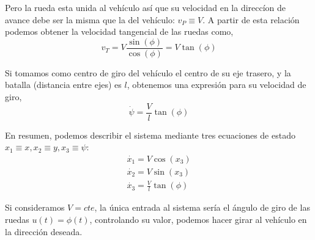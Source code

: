 Pero la rueda esta unida al vehículo así que su velocidad en la direccíon de avance debe ser la misma que la del vehículo: $v_P \equiv V$.  A partir de esta relación podemos obtener la velocidad tangencial de las ruedas como,
\begin{equation}
v_T = V\frac{\sin(\phi)}{\cos(\phi)} = V\tan(\phi)
\end{equation}

Si tomamos como centro de giro del vehículo el centro de su eje trasero, y la batalla (distancia entre ejes) es $l$, obtenemos una expresión para su velocidad de giro,
\begin{equation}
\dot{\psi} = \frac{V}{l}\tan(\phi)
\end{equation}

En resumen, podemos describir el sistema mediante tres ecuaciones de estado $x_1 \equiv x, x_2\equiv	y, x_3 \equiv \psi$:
\begin{align}
\dot{x_1} =  V\cos(x_3)\\  
\dot{x_2} =  V\sin(x_3)\\
\dot{x_3} = \frac{V}{l}\tan(\phi)
\end{align}

Si consideramos $V=cte$, la única entrada al sistema sería el ángulo de giro de las ruedas $u(t) = \phi(t)$, controlando su valor, podemos hacer girar al vehículo en la dirección deseada. 
 